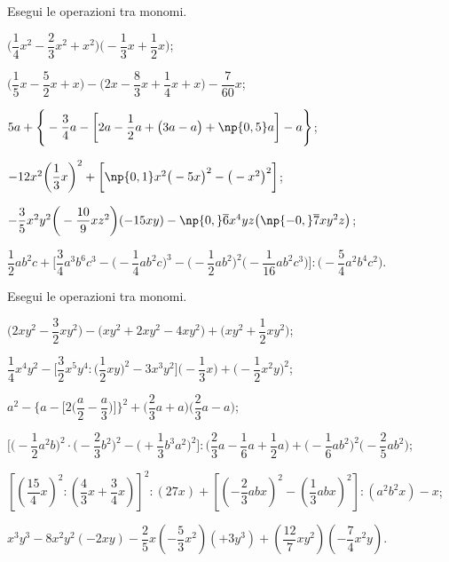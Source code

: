\begin{esercizio}[\Ast]
 \label{ese:10.33} %
Esegui le operazioni tra monomi.

\begin{enumeratea}
 \item $\bigg(\dfrac{1}{4}x^{2}-\dfrac{2}{3}x^{2}+x^{2}\bigg)\bigg(-{\dfrac{1}{3}}x+\dfrac{1}{2}x\bigg)$;
 \item $\bigg(\dfrac{1}{5}x-\dfrac{5}{2}x+x\bigg)-\bigg(2x-\dfrac{8}{3}x+\dfrac{1}{4}x+x\bigg)-\dfrac{7}{60}x$;
 \item $5a+\Bigg\{-{\dfrac{3}{4}}a-\bigg[2a-\dfrac{1}{2}a+\big(3a-a\big)+\np{0,5}a\bigg]-a\Bigg\}$;
 \item $-12x^{2}\bigg(\dfrac{1}{3}x\bigg)^{2}+\bigg[\np{0,1}x^{2}\big(-5x\big)^{2}-\big(-x^{2}\big)^{2}\bigg]$;
 \item $-{\dfrac{3}{5}}x^{2}y^{2}\bigg(-{\dfrac{10}{9}}xz^{2}\bigg)(-15xy)-\np{0,}\overline{{6}}x^{4}yz\big(\np{-0,}\overline{{7}}xy^{2}z\big)$;
 \item $\dfrac{1}{2}ab^{2}c+\Bigg[\dfrac{3}{4}a^{3}b^{6}c^{3}-\bigg(-{\dfrac{1}{4}ab^{2}c}\bigg)^{3}-\bigg(-{\dfrac{1}{2}ab^{2}}\bigg)^{2}\bigg(-{\dfrac{1}{16}ab^{2}c^{3}}\bigg)\Bigg]:%
 \bigg(-{\dfrac{5}{4}a^{2}b^{4}c^{2}}\bigg)$.
\end{enumeratea}
\end{esercizio}

\begin{esercizio}[\Ast]
 \label{ese:10.34} %
Esegui le operazioni tra monomi.

\begin{enumeratea}
 \item $\bigg(2xy^{2}-\dfrac{3}{2}xy^{2}\bigg)-\big(xy^{2}+2xy^{2}-4xy^{2}\big)+\bigg(xy^{2}+\dfrac{1}{2}xy^{2}\bigg)$;
 \item $\dfrac{1}{4}x^{4}y^{2}-\bigg[\dfrac{3}{2}x^{5}y^{4}:\bigg(\dfrac{1}{2}xy\bigg)^{2}-3x^{3}y^{2}\bigg]%
 \bigg(-{\dfrac{1}{3}}x\bigg)+\bigg(-{\dfrac{1}{2}}x^{2}y\bigg)^{2}$;
 \item $a^{2}-\Bigg\{a-\bigg[2\bigg(\dfrac{a}{2}-\dfrac{a}{3}\bigg)\bigg]\Bigg\}^{2}+%
 \bigg(\dfrac{2}{3}a+a\bigg)\bigg(\dfrac{2}{3}a-a\bigg)$;
 \item $\bigg[\bigg(-{\dfrac{1}{2}}a^{2}b\bigg)^{2}\cdot\bigg(-{\dfrac{2}{3}}b^{2}\bigg)^{2}-%
 \bigg(+{\dfrac{1}{3}}b^{3}a^{2}\bigg)^{2}\bigg]:\bigg(\dfrac{2}{3}a-\dfrac{1}{6}a+\dfrac{1}{2}a\bigg)+\bigg(-{\dfrac{1}{6}}ab^{2}\bigg)^2%
 \bigg(-{\dfrac{2}{5}}ab^2\bigg)$;
 \item $\left[\left(\dfrac{15}{4}x\right)^{2}:\left(\dfrac{4}{3}x+\dfrac{3}{4}x\right)\right]^{2}%
:(27x)+\left[\left(-{\dfrac{2}{3}}abx\right)^{2}-\left(\dfrac{1}{3}abx\right)^{2}\right]:(a^{2}b^{2}x)-x$;
 \item $x^{3}y^{3}-8x^{2}y^{2}(-2xy)-\dfrac{2}{5}x\left(-{\dfrac{5}{3}}x^{2}\right)\left(+3y^{3}\right)+\left(\dfrac{12}{7}xy^{2}\right)\left(-\dfrac{7}{4}x^{2}y\right)$.
\end{enumeratea}
\end{esercizio}


